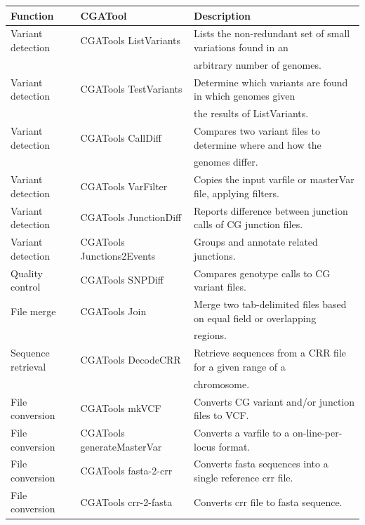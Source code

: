\begin{table}[t!]
\small
\begin{tabular}{l|l|l}
\textbf{Function} & \textbf{CGATool}  & \textbf{Description} \\ \toprule
Variant detection & CGATools ListVariants & Lists the non-redundant set of small variations found in an \\
                  &                       & arbitrary number of genomes.\\
Variant detection & CGATools TestVariants & Determine which variants are found in which genomes given \\
                  &                       & the results of ListVariants.\\
Variant detection & CGATools CallDiff     & Compares two variant files to determine where and how the \\
                  &                       & genomes differ.\\
Variant detection & CGATools VarFilter    & Copies the input varfile or masterVar file, applying filters.\\
Variant detection & CGATools JunctionDiff & Reports difference between junction calls of CG junction files.\\
Variant detection & CGATools Junctions2Events & Groups and annotate related junctions.\\
Quality control   & CGATools SNPDiff      & Compares genotype calls to CG variant files.\\
File merge        & CGATools Join         & Merge two tab-delimited files based on equal field or overlapping \\
                  &                       & regions.\\
Sequence retrieval& CGATools DecodeCRR    & Retrieve sequences from a CRR file for a given range of a \\
                  &                       & chromosome.\\
File conversion   & CGATools mkVCF        & Converts CG variant and/or junction files to VCF.\\
File conversion   & CGATools generateMasterVar & Converts a varfile to a on-line-per-locus format.\\
File conversion   & CGATools fasta-2-crr  & Converts fasta sequences into a single reference crr file.\\
File conversion   & CGATools crr-2-fasta  & Converts crr file to fasta sequence.\\

\end{tabular}
\end{table}
